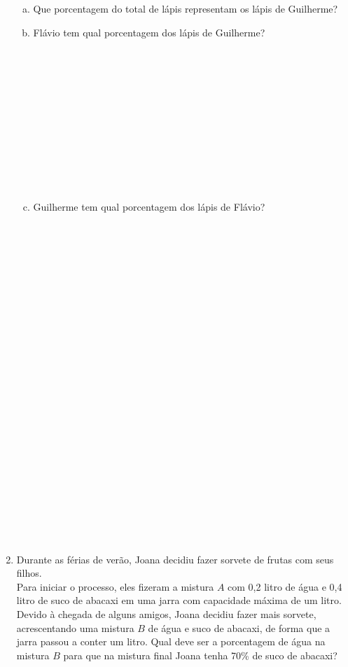 \documentclass[a4paper,14pt]{article}
\begin{document}
\begin{multicols}{2}
\begin{enumerate}
\begin{enumerate}[a)]
				\item Que porcentagem do total de lápis representam os lápis de Guilherme? \newpage
				\item Flávio tem qual porcentagem dos lápis de Guilherme? \\\\\\\\\\\\\\\\\\\\\\\\
				\item Guilherme tem qual porcentagem dos lápis de Flávio? \\\\\\\\\\\\\\\\\\\\\\\\\\\\\\\\\\\\\\\\\\\\\\\\\\
			\end{enumerate}
			\item Durante as férias de verão, Joana decidiu fazer sorvete de frutas com seus filhos. \\
			Para iniciar o processo, eles fizeram a mistura $A$ com 0,2 litro de água e 0,4 litro de suco de abacaxi em uma jarra com capacidade máxima de um litro. \\
			Devido à chegada de alguns amigos, Joana decidiu fazer mais sorvete, acrescentando uma mistura $B$ de água e suco de abacaxi, de forma que a jarra passou a conter um litro. Qual deve ser a porcentagem de água na mistura $B$ para que na mistura final Joana tenha 70\% de suco de abacaxi? \\\\\\\\\\\\\\\\\\\\\\\\

\end{enumerate}
\end{multicols}
\end{document}
